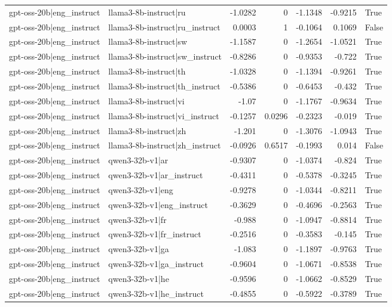 \begin{table}
\begin{tabular}{l l r r r r l}
gpt-oss-20b|eng_instruct & llama3-8b-instruct|ru & -1.0282 & 0 & -1.1348 & -0.9215 & True \\
gpt-oss-20b|eng_instruct & llama3-8b-instruct|ru_instruct & 0.0003 & 1 & -0.1064 & 0.1069 & False \\
gpt-oss-20b|eng_instruct & llama3-8b-instruct|sw & -1.1587 & 0 & -1.2654 & -1.0521 & True \\
gpt-oss-20b|eng_instruct & llama3-8b-instruct|sw_instruct & -0.8286 & 0 & -0.9353 & -0.722 & True \\
gpt-oss-20b|eng_instruct & llama3-8b-instruct|th & -1.0328 & 0 & -1.1394 & -0.9261 & True \\
gpt-oss-20b|eng_instruct & llama3-8b-instruct|th_instruct & -0.5386 & 0 & -0.6453 & -0.432 & True \\
gpt-oss-20b|eng_instruct & llama3-8b-instruct|vi & -1.07 & 0 & -1.1767 & -0.9634 & True \\
gpt-oss-20b|eng_instruct & llama3-8b-instruct|vi_instruct & -0.1257 & 0.0296 & -0.2323 & -0.019 & True \\
gpt-oss-20b|eng_instruct & llama3-8b-instruct|zh & -1.201 & 0 & -1.3076 & -1.0943 & True \\
gpt-oss-20b|eng_instruct & llama3-8b-instruct|zh_instruct & -0.0926 & 0.6517 & -0.1993 & 0.014 & False \\
gpt-oss-20b|eng_instruct & qwen3-32b-v1|ar & -0.9307 & 0 & -1.0374 & -0.824 & True \\
gpt-oss-20b|eng_instruct & qwen3-32b-v1|ar_instruct & -0.4311 & 0 & -0.5378 & -0.3245 & True \\
gpt-oss-20b|eng_instruct & qwen3-32b-v1|eng & -0.9278 & 0 & -1.0344 & -0.8211 & True \\
gpt-oss-20b|eng_instruct & qwen3-32b-v1|eng_instruct & -0.3629 & 0 & -0.4696 & -0.2563 & True \\
gpt-oss-20b|eng_instruct & qwen3-32b-v1|fr & -0.988 & 0 & -1.0947 & -0.8814 & True \\
gpt-oss-20b|eng_instruct & qwen3-32b-v1|fr_instruct & -0.2516 & 0 & -0.3583 & -0.145 & True \\
gpt-oss-20b|eng_instruct & qwen3-32b-v1|ga & -1.083 & 0 & -1.1897 & -0.9763 & True \\
gpt-oss-20b|eng_instruct & qwen3-32b-v1|ga_instruct & -0.9604 & 0 & -1.0671 & -0.8538 & True \\
gpt-oss-20b|eng_instruct & qwen3-32b-v1|he & -0.9596 & 0 & -1.0662 & -0.8529 & True \\
gpt-oss-20b|eng_instruct & qwen3-32b-v1|he_instruct & -0.4855 & 0 & -0.5922 & -0.3789 & True \\

\end{tabular}
\end{table}
